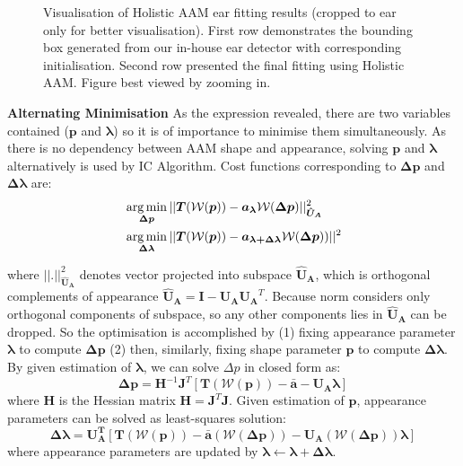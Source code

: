 \begin{figure}[!t]
    \caption{Visualisation of Holistic AAM ear fitting results (cropped to ear only for better visualisation). First row demonstrates the bounding box generated from our in-house ear detector with corresponding initialisation. Second row presented the final fitting using Holistic AAM. Figure best viewed by zooming in.}
    \label{fig:fitting_visualise}
\end{figure}


\noindent\textbf{Alternating Minimisation}
As the expression revealed, there are two variables contained ($\bm{p}$ and $\bm{\lambda}$) so it is of importance to minimise them simultaneously. As there is no dependency between AAM shape and appearance, solving $\bm{p}$ and $\bm{\lambda}$ alternatively is used by IC Algorithm. Cost functions corresponding to $\bm{\Delta p}$ and $\bm{\Delta \lambda}$ are:
\begin{align}
    \label{eq:aamfittingappearancevariance}
    & \operatorname*{arg\,min}_{\bm{\Delta p}}||\bm{T}(\mathcal{W}(\bm{p}))-\bm{a_\lambda}\mathcal{W}(\bm{\Delta p})||^2_{\bm{\hat{U}_A}} \\
    & \operatorname*{arg\,min}_{\bm{\Delta\lambda}}||\bm{T}(\mathcal{W}(\bm{p}))-\bm{a_{\lambda+\Delta \lambda}}{\mathcal{W}({\bm{\Delta p}})})||^2
\end{align}

where $||.||^2_{\bm{\hat{U}_A}}$ denotes vector projected into subspace $\bm{\hat{U}_A}$, which is orthogonal complements of appearance $\bm{\hat{U}_A}=\bm{I}-\bm{U_A} \bm{U_A}^T$. Because norm considers only orthogonal components of subspace, so any other components lies in $\bm{\hat{U}_A}$ can be dropped. So the optimisation is accomplished by (1) fixing appearance parameter $\bm{\lambda}$ to compute $\bm{\Delta p}$ (2) then, similarly, fixing shape parameter $\bm{p}$ to compute $\bm{\Delta\lambda}$. By given estimation of $\bm{\lambda}$, we can solve $\Delta p$ in closed form as: 
\begin{equation}
    \label{eq:dpic}
    \bm{\Delta p}=\bm{H}^{-1}\bm{J}^T[\bm{T}(\mathcal{W}(\bm{p}))-\bm{\bar{a}}-\bm{U_A}\bm{\lambda}]
\end{equation}
where $\bm{H}$ is the Hessian matrix $\bm{H}=\bm{J}^T\bm{J}$. Given estimation of $\bm{p}$, appearance parameters can be solved as least-squares solution:
\begin{equation}
    \label{eq:lambdaic}
    \bm{\Delta \lambda}=\bm{U_A^T}[\bm{T}(\mathcal{W}(\bm{p}))-\bm{\bar{a}}(\mathcal{W}(\bm{\Delta p}))-\bm{U_A}(\mathcal{W}(\bm{\Delta p}))\bm{\lambda}]
\end{equation}
where appearance parameters are updated by $\bm{\lambda}\leftarrow\bm{\lambda}+\bm{\Delta \lambda}$. 

